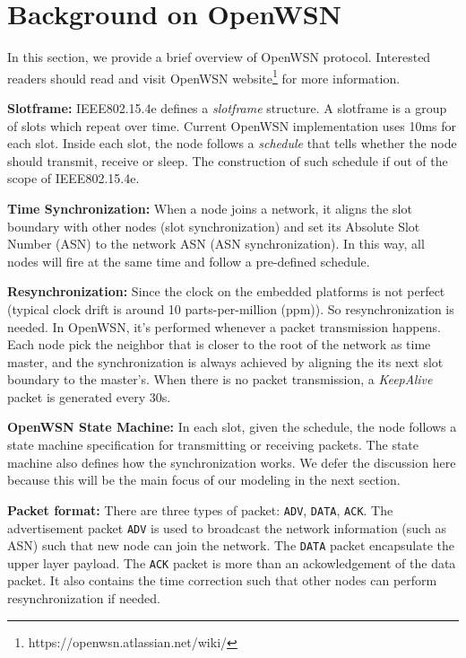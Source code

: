 \section{Background on OpenWSN}
\label{sec:background-openwsn}

In this section, we provide a brief overview of OpenWSN protocol. Interested readers should read \cite{watteyne2012openwsn, IEEE802.15.4e} and visit OpenWSN website\footnote{https://openwsn.atlassian.net/wiki/} for more information. 

{\bf Slotframe:} IEEE802.15.4e defines a {\em slotframe} structure. A slotframe is a group of slots which repeat over time. Current OpenWSN implementation uses 10ms for each slot. Inside each slot, the node follows a {\em schedule} that tells whether the node should transmit, receive or sleep. The construction of such schedule if out of the scope of IEEE802.15.4e.

{\bf Time Synchronization:} When a node joins a network, it aligns the slot boundary with other nodes (slot synchronization) and set its Absolute Slot Number (ASN) to the network ASN (ASN synchronization). In this way, all nodes will fire at the same time and follow a pre-defined schedule. 

{\bf Resynchronization:} Since the clock on the embedded platforms is not perfect (typical clock drift is around 10 parts-per-million (ppm)). So resynchronization is needed. In OpenWSN, it's performed whenever a packet transmission happens. Each node pick the neighbor that is closer to the root of the network as time master, and the synchronization is always achieved by aligning the its next slot boundary to the master's. When there is no packet transmission, a {\em KeepAlive} packet is generated every 30s.

{\bf OpenWSN State Machine:} In each slot, given the schedule, the node follows a state machine specification for transmitting or receiving packets. The state machine also defines how the synchronization works. We defer the discussion here because this will be the main focus of our modeling in the next section.

{\bf Packet format:} There are three types of packet: \texttt{ADV}, \texttt{DATA}, \texttt{ACK}. The advertisement packet \texttt{ADV} is used to broadcast the network information (such as ASN) such that new node can join the network. The \texttt{DATA} packet encapsulate the upper layer payload. The \texttt{ACK} packet is more than an ackowledgement of the data packet. It also contains the time correction such that other nodes can perform resynchronization if needed.


